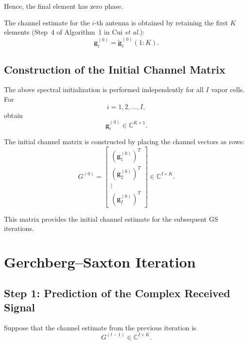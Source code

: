 \documentclass[12pt,a4paper]{article}
\begin{document}
Hence, the final element has zero phase.

The channel estimate for the $i$-th antenna is obtained by retaining
the first $K$ elements (Step~4 of Algorithm~1 in Cui \emph{et al.}):
\begin{equation}
\boxed{
\mathbf g_i^{(0)}
=
\widetilde{\mathbf g}_i^{(0)}(1:K)
}.
\tag{281}
\end{equation}

\subsection{Construction of the Initial Channel Matrix}

The above spectral initialization is performed independently for all
$I$ vapor cells. For
\begin{equation}
i=1,2,\ldots,I,
\tag{282}
\end{equation}
obtain
\begin{equation}
\mathbf g_i^{(0)}
\in
\mathbb{C}^{K\times1}.
\tag{283}
\end{equation}

The initial channel matrix is constructed by placing the channel
vectors as rows:
\begin{equation}
\boxed{
G^{(0)}
=
\begin{bmatrix}
(\mathbf g_1^{(0)})^T\\
(\mathbf g_2^{(0)})^T\\
\vdots\\
(\mathbf g_I^{(0)})^T
\end{bmatrix}
\in
\mathbb{C}^{I\times K}
}.
\tag{284}
\end{equation}

This matrix provides the initial channel estimate for the subsequent
GS iterations.

\section{Gerchberg--Saxton Iteration}

\subsection{Step 1: Prediction of the Complex Received Signal}

Suppose that the channel estimate from the previous iteration is
\begin{equation}
G^{(t-1)}
\in
\mathbb{C}^{I\times K}.
\tag{285}
\end{equation}
\end{document}
